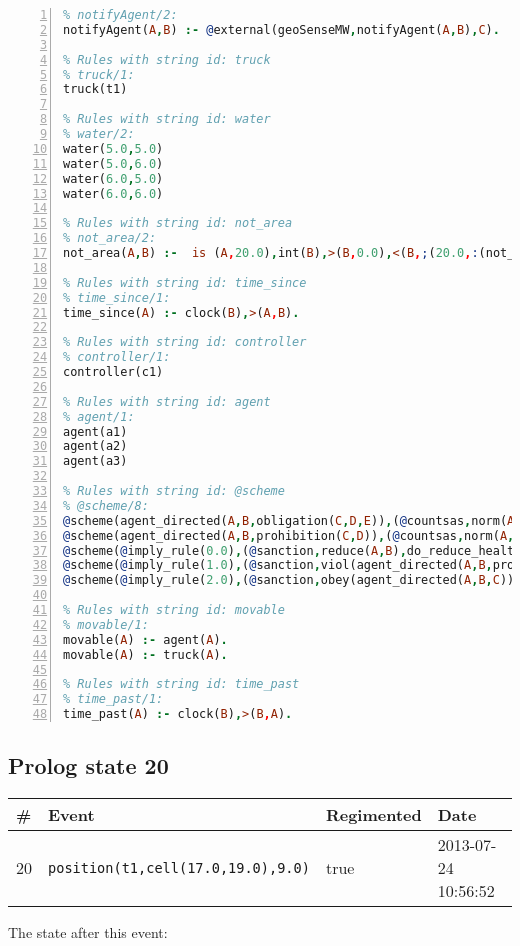 \documentclass[11pt]{article}\usepackage[utf8]{inputenc}\usepackage{geometry}
\begin{document}
\begin{lstlisting}[language=Prolog, numbers=left]
% Rules with string id: notifyAgent
% notifyAgent/2:
notifyAgent(A,B) :- @external(geoSenseMW,notifyAgent(A,B),C).

% Rules with string id: truck
% truck/1:
truck(t1)

% Rules with string id: water
% water/2:
water(5.0,5.0)
water(5.0,6.0)
water(6.0,5.0)
water(6.0,6.0)

% Rules with string id: not_area
% not_area/2:
not_area(A,B) :-  is (A,20.0),int(B),>(B,0.0),<(B,;(20.0,:(not_area(A,B), is (-(B),20.0)))),int(A),>(A,0.0),<(A,;(20.0,:(area(A,B),-(int(A))))),int(B),>(A,0.0),>(B,0.0),<(A,21.0),<(B,21.0).

% Rules with string id: time_since
% time_since/1:
time_since(A) :- clock(B),>(A,B).

% Rules with string id: controller
% controller/1:
controller(c1)

% Rules with string id: agent
% agent/1:
agent(a1)
agent(a2)
agent(a3)

% Rules with string id: @scheme
% @scheme/8:
@scheme(agent_directed(A,B,obligation(C,D,E)),(@countsas,norm(A,B,F,obligation(C,D,E)),F),false,(listTrue(C)),(time_past(D)),false,[plus(viol(agent_directed(A,B,obligation(C,D,E))))|[]],[plus(obey(agent_directed(A,B,obligation(C,D,E))))|[]])
@scheme(agent_directed(A,B,prohibition(C,D)),(@countsas,norm(A,B,E,prohibition(C,D)),E),(listTrue(C)),false,(false),false,[plus(viol(agent_directed(A,B,prohibition(C,D))))|[]],[plus(obey(agent_directed(A,B,prohibition(C,D))))|[]])
@scheme(@imply_rule(0.0),(@sanction,reduce(A,B),do_reduce_health(A,B),notifyAgent(A,changed(status))),true,false,false,false,[min(reduce(A,B))|[]],[])
@scheme(@imply_rule(1.0),(@sanction,viol(agent_directed(A,B,prohibition(C,D))),do_sanction(D)),true,false,false,false,[min(viol(agent_directed(A,B,prohibition(C,D))))|[]],[])
@scheme(@imply_rule(2.0),(@sanction,obey(agent_directed(A,B,C))),true,false,false,false,[min(obey(agent_directed(A,B,C)))|[]],[])

% Rules with string id: movable
% movable/1:
movable(A) :- agent(A).
movable(A) :- truck(A).

% Rules with string id: time_past
% time_past/1:
time_past(A) :- clock(B),>(B,A).

\end{lstlisting}
\clearpage 
\subsection{Prolog state 20}
\begin{table}[ht]
\centering 
\begin{tabular}{l l l l} 
\textbf{\#} & \textbf{Event} & \textbf{Regimented} & \textbf{Date} \\ [0.5ex] 
\hline
20&\texttt{position(t1,cell(17.0,19.0),9.0)}&true&2013-07-24 10:56:52\\ [1ex] \hline\end{tabular}
\end{table}
The state after this event:
\end{document}

